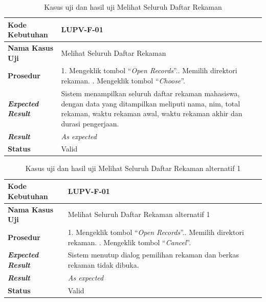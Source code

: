 \begin{longtable}{|L{3cm}|L{9cm}|}
  \caption{Kasus uji dan hasil uji Melihat Seluruh Daftar Rekaman}\label{tab:val-dashboard-main} \\
  \hline
  \textbf{Kode Kebutuhan} & LUPV-F-01 \\\hline
  \textbf{Nama Kasus Uji} & Melihat Seluruh Daftar Rekaman \\\hline
  \textbf{Prosedur} & 1. Mengeklik tombol ``\emph{Open Records}''.. Memilih direktori rekaman. . Mengeklik tombol ``\emph{Choose}''.\\\hline
  \textbf{\emph{Expected Result}} & Sistem menampilkan seluruh daftar rekaman mahasiswa, dengan data
                                    yang ditampilkan meliputi nama, nim, total rekaman, waktu rekaman
                                    awal, waktu rekaman akhir dan durasi pengerjaan.\\\hline
  \textbf{\emph{Result}} & \emph{As expected} \\\hline
  \textbf{Status} & Valid\\\hline
\end{longtable}

\begin{longtable}{|L{3cm}|L{9cm}|}
  \caption{Kasus uji dan hasil uji Melihat Seluruh Daftar Rekaman alternatif 1}\label{tab:val-dashboard-1} \\
  \hline
  \textbf{Kode Kebutuhan} & LUPV-F-01 \\\hline
  \textbf{Nama Kasus Uji} & Melihat Seluruh Daftar Rekaman alternatif 1 \\\hline
  \textbf{Prosedur} & 1. Mengeklik tombol ``\emph{Open Records}''.. Memilih direktori rekaman. . Mengeklik tombol ``\emph{Cancel}''.\\\hline
  \textbf{\emph{Expected Result}} & Sistem menutup dialog pemilihan rekaman dan berkas rekaman tidak
                                    dibuka.\\\hline
  \textbf{\emph{Result}} & \emph{As expected} \\\hline
  \textbf{Status} & Valid\\\hline
\end{longtable}

